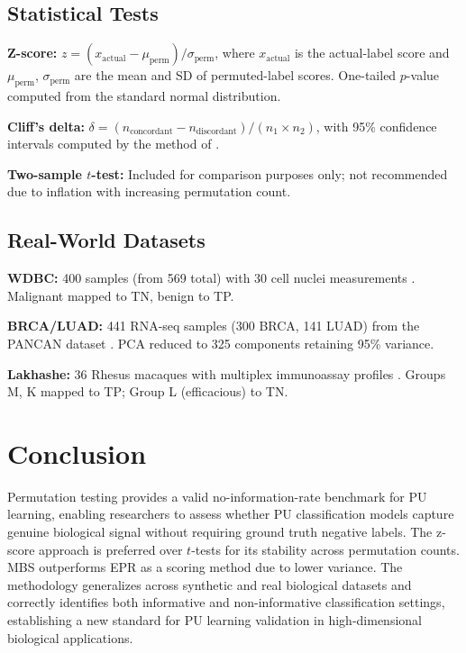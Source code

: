 \documentclass[11pt]{article}
\begin{document}
\subsection{Statistical Tests}

\textbf{Z-score:} $z = (x_{\text{actual}} - \mu_{\text{perm}}) / \sigma_{\text{perm}}$, where $x_{\text{actual}}$ is the actual-label score and $\mu_{\text{perm}}$, $\sigma_{\text{perm}}$ are the mean and SD of permuted-label scores. One-tailed $p$-value computed from the standard normal distribution.

\textbf{Cliff's delta:} $\delta = (n_{\text{concordant}} - n_{\text{discordant}}) / (n_1 \times n_2)$, with 95\% confidence intervals computed by the method of \citet{cliff1993}.

\textbf{Two-sample $t$-test:} Included for comparison purposes only; not recommended due to inflation with increasing permutation count.

\subsection{Real-World Datasets}

\textbf{WDBC:} 400 samples (from 569 total) with 30 cell nuclei measurements \citep{wolberg1995}. Malignant mapped to TN, benign to TP.

\textbf{BRCA/LUAD:} 441 RNA-seq samples (300 BRCA, 141 LUAD) from the PANCAN dataset \citep{weinstein2013}. PCA reduced to 325 components retaining 95\% variance.

\textbf{Lakhashe:} 36 Rhesus macaques with multiplex immunoassay profiles \citep{lakhashe2021}. Groups M, K mapped to TP; Group L (efficacious) to TN.

\section{Conclusion}

Permutation testing provides a valid no-information-rate benchmark for PU learning, enabling researchers to assess whether PU classification models capture genuine biological signal without requiring ground truth negative labels. The z-score approach is preferred over $t$-tests for its stability across permutation counts. MBS outperforms EPR as a scoring method due to lower variance. The methodology generalizes across synthetic and real biological datasets and correctly identifies both informative and non-informative classification settings, establishing a new standard for PU learning validation in high-dimensional biological applications.


\end{document}
